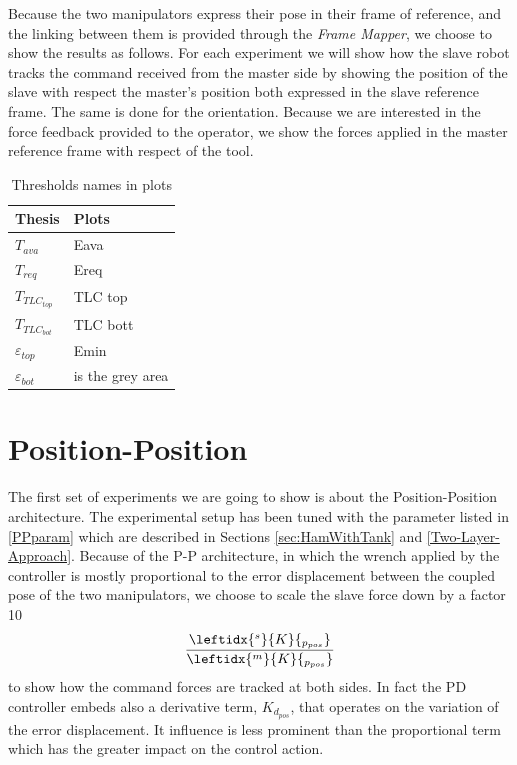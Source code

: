 Because the two manipulators express their pose in their frame of reference, and the linking between them is provided through the \textit{Frame Mapper}, we choose to show the results as follows.
For each experiment we will show how the slave robot tracks the command received from the master side by showing the position of the slave with respect the master's position both expressed in the slave reference frame. The same is done for the orientation.
Because we are interested in the force feedback provided to the operator, we show the forces applied in the master reference frame with respect of the tool.
\begin{table}
	\centering
	\begin{tabular}{ll}
		\toprule
		Thesis & Plots \\ 
		\midrule
		$T_{ava}$  & Eava\\
		$T_{req}$ & Ereq\\
		$T_{TLC_{top}}$ & TLC top\\
		$T_{TLC_{bot}}$ &TLC bott\\
		$\varepsilon_{top}$ & Emin\\
		$\varepsilon_{bot}$ & is the grey area \\
		\bottomrule
	\end{tabular} 
	\caption[Tresholds]{Thresholds names in plots}
	\label{threshold}
\end{table}
\newpage
\section{Position-Position}
The first set of experiments we are going to show is about the Position-Position architecture.
The experimental setup has been tuned with the parameter listed in \tablename{ \ref{PPparam}} 
which are described in Sections \ref{sec:HamWithTank} and \ref{Two-Layer-Approach}.
Because of the P-P architecture, in which the wrench applied by the controller is mostly proportional to the error displacement between the coupled pose of the two manipulators, we choose to scale the slave force down by a factor 10 \[ \dfrac{\leftidx{^{s}}{K}{_{p_{pos}}}}{\leftidx{^{m}}{K}{_{p_{pos}}}} \] to show how the command forces are tracked at both sides. In fact the PD controller embeds also a derivative term, $K_{d_{pos}}$, that operates on the variation of the error displacement. It influence is less prominent than the proportional term which has the greater impact on the control action.

